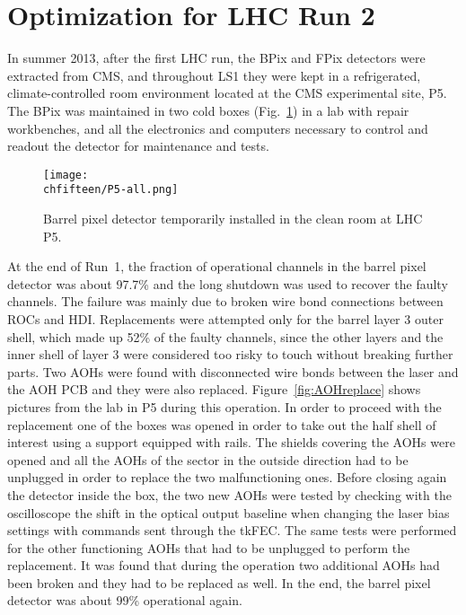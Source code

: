 \section{Optimization for LHC Run 2}


In summer 2013, after the first LHC run, the BPix and FPix detectors were extracted from CMS, and throughout LS1 they were kept in a refrigerated, climate-controlled room environment located at the CMS experimental site, P5.
The BPix was maintained in two cold boxes (Fig.~\ref{fig:PixP5}) in a lab with repair workbenches, and all the electronics and computers necessary to control and readout the detector for maintenance and tests.

\begin{figure}[!htb]
 \begin{center}
 \texttt{[image: \\chfifteen/P5-all.png]}
 \end{center}
 \caption{Barrel pixel detector temporarily installed in the clean room at LHC P5.}
 \label{fig:PixP5}
\end{figure}

At the end of Run~1, the fraction of operational channels in the barrel pixel detector was about 97.7\% and the long shutdown was used to recover the faulty channels.
The failure was mainly due to broken wire bond connections between ROCs and HDI. 
Replacements were attempted only for the barrel layer 3 outer shell, which made up 52\% of the faulty channels, since the other layers and the inner shell of layer 3 were considered too risky to touch without breaking further parts.
Two AOHs were found with disconnected wire bonds between the laser and the AOH PCB and they were also replaced. Figure~\ref{fig:AOHreplace} shows pictures from the lab in P5 during this operation. In order to proceed with the replacement one of the boxes was opened in order to take out the half shell of interest using a support equipped with rails. The shields covering the AOHs were opened and all the AOHs of the sector in the outside direction had to be unplugged in order to replace the two malfunctioning ones. Before closing again the detector inside the box, the two new AOHs were tested by checking with the oscilloscope the shift in the optical output baseline when changing the laser bias settings with commands sent through the tkFEC. The same tests were performed for the other functioning AOHs that had to be unplugged to perform the replacement. It was found that during the operation two additional AOHs had been broken and they had to be replaced as well.
In the end, the barrel pixel detector was about 99\% operational again.

